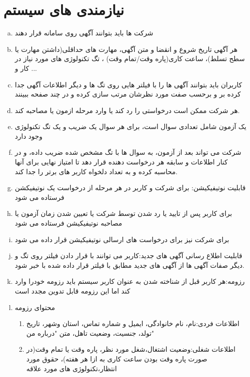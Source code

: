\documentclass{article}
\begin{document}
\section{نیازمندی های سیستم}
    \begin{enumerate}[a.]
        \item شرکت ها باید بتوانند آگهی روی سامانه قرار دهند 
        \item هر آگهی تاریخ شروع و انقضا و متن آگهی، مهارت های حداقلی(داشتن مهارت یا سطح تسلط)، ساعت کاری(پاره وقت/تمام وقت) ، تگ تکنولوژی های مورد نیاز در کار و ...
        \item کاربران باید بتوانند آگهی ها را با فیلتر هایی روی تگ ها و دیگر اطلاعات آگهی جدا کرده بر و برحسب صفت مورد نظرشان مرتب سازی کرده و در چند صفحه ببینند
        \item هر شرکت ممکن است درخواستی را رد کند یا وارد مرحله ازمون یا مصاحبه کند.
        \item  یک آزمون شامل تعدادی سوال است، برای هر سوال یک ضریب و یک تگ تکنولوژی وجود دارد
        \item شرکت می تواند بعد از آزمون، به سوال ها با تگ مشخص شده ضریب داده، و در کنار اطلاعات و سابقه هر درخواست دهنده قرار دهد تا امتیاز نهایی برای آنها محاسبه کرده و به تعداد دلخواه کاربر های برتر را جدا کند.
        \item قابلیت نوتیفیکیشن: برای شرکت و کاربر در هر مرحله از درخواست یک نوتیفیکشن فرستاده می شود
        \item برای کاربر پس از تایید یا رد شدن توسط شرکت یا تعیین شدن زمان آزمون یا مصاحبه نوتیفیکیشن فرستاده می شود
        \item برای شرکت نیز برای درخواست های ارسالی نوتیفیکیشن قرار داده می شود
        \item قابلیت اطلاع رسانی آگهی های جدید:کاربر می توانند با قرار دادن فیلتر روی تگ و دیگر صفات آگهی ها
        از آگهی های جدید مطابق با فیلتر قرار داده شده با خبر شود.
        \item رزومه:هر کاربر قبل از شناخته شدن به عنوان کاربر سیستم باید رزومه خودرا وارد کند اما این رزومه قابل تدوین مجدد است
        \item محتوای رزومه
            \begin{enumerate}[1.]
                \item اطلاعات فردی:نام، نام خانوادگی، ایمیل و شماره تماس، استان وشهر، تاریخ تولد، جنسیت، وضعیت تاهل، متن "درباره من"
                \item اطلاعات شغلی:وضعیت اشتغال،شغل مورد نظر، پاره وقت یا تمام وقت(در صورت پاره وقت بودن ساعت کاری به ازا هر هفته)، حقوق مورد انتظار،تکنولوژی های مورد علاقه

\end{enumerate}
\end{enumerate}
\end{document}
